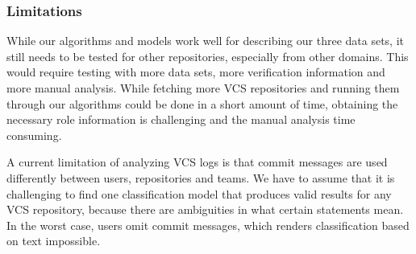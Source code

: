\subsubsection{Limitations}

While our algorithms and models work well for describing our three data sets, it still needs to be tested for other repositories, especially from other domains. This would require testing with more data sets, more verification information and more manual analysis. While fetching more VCS repositories and running them through our algorithms could be done in a short amount of time, obtaining the necessary role information is challenging and the manual analysis time consuming.

A current limitation of analyzing VCS logs is that commit messages are used differently between users, repositories and teams. We have to assume that it is challenging to find one classification model that produces valid results for any VCS repository, because there are ambiguities in what certain statements mean. In the worst case, users omit commit messages, which renders classification based on text impossible.

